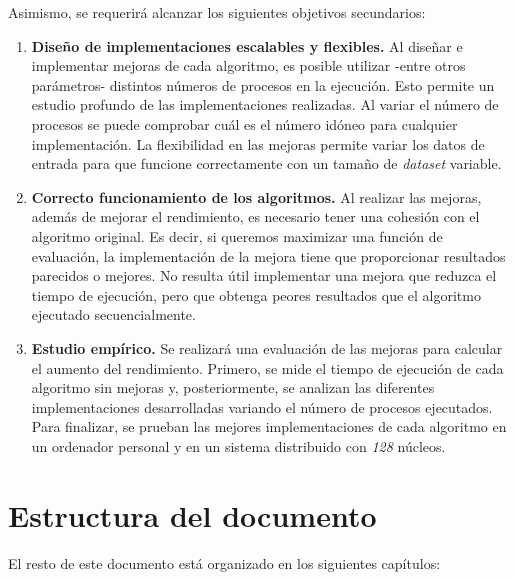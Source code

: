 	Asimismo, se requerirá alcanzar los siguientes objetivos secundarios:
	
	\begin{enumerate}
		\item \textbf{Diseño de implementaciones escalables y flexibles.} Al diseñar e implementar mejoras de cada algoritmo, es posible utilizar -entre otros parámetros- distintos números de procesos en la ejecución. Esto permite un estudio profundo de las implementaciones realizadas. Al variar el número de procesos se puede comprobar cuál es el número idóneo para cualquier implementación. La flexibilidad en las mejoras permite variar los datos de entrada para que funcione correctamente con un tamaño de \textit{dataset} variable.
		\item \textbf{Correcto funcionamiento de los algoritmos.} Al realizar las mejoras, además de mejorar el rendimiento, es necesario tener una cohesión con el algoritmo original. Es decir, si queremos maximizar una función de evaluación, la implementación de la mejora tiene que proporcionar resultados parecidos o mejores. No resulta útil implementar una mejora que reduzca el tiempo de ejecución, pero que obtenga peores resultados que el algoritmo ejecutado secuencialmente.
		\item \textbf{Estudio empírico.} Se realizará una evaluación de las mejoras para calcular el aumento del rendimiento. Primero, se mide el tiempo de ejecución de cada algoritmo sin mejoras y, posteriormente, se analizan las diferentes implementaciones desarrolladas variando el número de procesos ejecutados. Para finalizar, se prueban las mejores implementaciones de cada algoritmo en un ordenador personal y en un sistema distribuido con \textit{128} núcleos.
	\end{enumerate}





\section{Estructura del documento}
	El resto de este documento está organizado en los siguientes capítulos:
	

